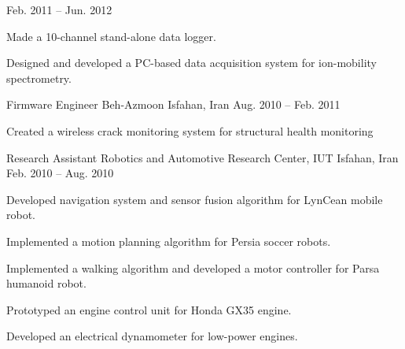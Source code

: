 \begin{cventries}
    {Feb. 2011 -- Jun. 2012}
    {
      \begin{cvitems}
        \item Made a 10-channel stand-alone data logger.
        \item Designed and developed a PC-based data acquisition system for ion-mobility spectrometry.
      \end{cvitems}
    }
  \cventry
    {Firmware Engineer}
    {Beh-Azmoon}
    {Isfahan, Iran}
    {Aug. 2010 -- Feb. 2011}
    {
      \begin{cvitems}
        \item Created a wireless crack monitoring system for structural health monitoring %
      \end{cvitems}
    }
  \cventry
    {Research Assistant}
    {Robotics and Automotive Research Center, IUT}
    {Isfahan, Iran}
    {Feb. 2010 -- Aug. 2010}
    {
      \begin{cvitems}
        \item Developed navigation system and sensor fusion algorithm for LynCean mobile robot.
        \item Implemented a motion planning algorithm for Persia soccer robots.
        \item Implemented a walking algorithm and developed a motor controller for Parsa humanoid robot.
        \item Prototyped an engine control unit for Honda GX35 engine.
        \item Developed an electrical dynamometer for low-power engines.
      \end{cvitems}
    }
\end{cventries} 